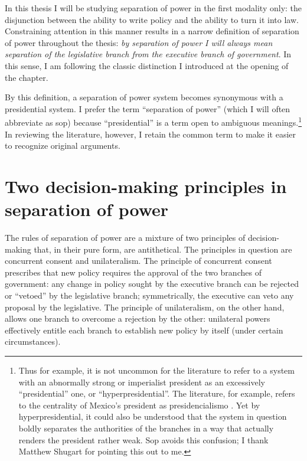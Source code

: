 In this thesis I will be studying separation of power in the first modality only: the disjunction between the ability to write policy and the ability to turn it into law.  Constraining attention in this manner results in a narrow definition of separation of power throughout the thesis: \emph{by separation of power I will always mean separation of the legislative branch from the executive branch of government}.  In this sense, I am following the classic distinction I introduced at the opening of the chapter.  

By this definition, a separation of power system becomes synonymous with a presidential system.  I prefer the term ``separation of power'' (which I will often abbreviate as sop) because ``presidential'' is a term open to ambiguous meanings.\footnote{Thus for example, it is not uncommon for the literature to refer to a system with an abnormally strong or imperialist president as an excessively ``presidential'' one, or ``hyperpresidential''.  The literature, for example, refers to the centrality of Mexico's president as presidencialismo \citep{carpizo.1978,weldon.1997}. Yet by hyperpresidential, it could also be understood that the system in question boldly separates the authorities of the branches in a way that actually renders the president rather weak.  Sop avoids this confusion; I thank Matthew Shugart for pointing this out to me.}  In reviewing the literature, however, I retain the common term to make it easier to recognize original arguments.  

\section{Two decision-making principles in separation of power}

The rules of separation of power are a mixture of two principles of decision-making that, in their pure form, are antithetical.  The principles in question are concurrent consent and unilateralism.  The principle of concurrent consent prescribes that new policy requires the approval of the two branches of government: any change in policy sought by the executive branch can be rejected or “vetoed” by the legislative branch; symmetrically, the executive can veto any proposal by the legislative.  The principle of unilateralism, on the other hand, allows one branch to overcome a rejection by the other: unilateral powers effectively entitle each branch to establish new policy by itself (under certain circumstances).  

